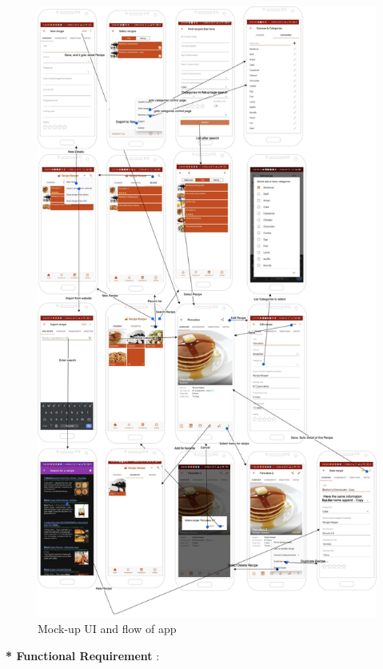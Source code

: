 \documentclass{article}
\begin{document}
\begin{figure}[h!]
\centerin
\includegraphics[scale=0.21]{Images/Mockup.jpg}
\caption{Mock-up UI and flow of app}
\label{fig:Mockup}
\end{figure}
\newpage
    \textbf{* Functional Requirement} : 
\end{document}
